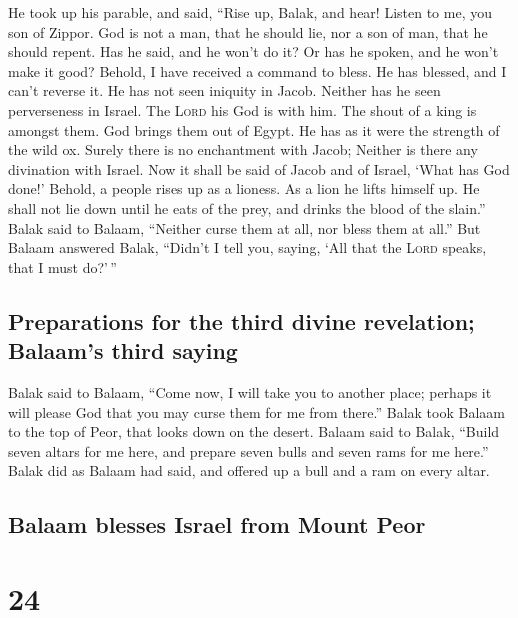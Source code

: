  He took up his parable, and said, ``Rise up, Balak, and
hear! Listen to me, you son of Zippor.  God is not a man,
that he should lie, nor a son of man, that he should repent. Has he
said, and he won't do it? Or has he spoken, and he won't make it good?
 Behold, I have received a command to bless. He has
blessed, and I can't reverse it.  He has not seen
iniquity in Jacob. Neither has he seen perverseness in Israel. The
\textsc{Lord} his God is with him. The shout of a king is amongst them.
 God brings them out of Egypt. He has as it were the
strength of the wild ox.  Surely there is no enchantment
with Jacob; Neither is there any divination with Israel. Now it shall be
said of Jacob and of Israel, `What has God done!' 
Behold, a people rises up as a lioness. As a lion he lifts himself up.
He shall not lie down until he eats of the prey, and drinks the blood of
the slain.''  Balak said to Balaam, ``Neither curse them
at all, nor bless them at all.''  But Balaam answered
Balak, ``Didn't I tell you, saying, `All that the \textsc{Lord} speaks,
that I must do?'\,''

\hypertarget{preparations-for-the-third-divine-revelation-balaams-third-saying}{%
\subsection{Preparations for the third divine revelation; Balaam's third
saying}\label{preparations-for-the-third-divine-revelation-balaams-third-saying}}

 Balak said to Balaam, ``Come now, I will take you to
another place; perhaps it will please God that you may curse them for me
from there.''  Balak took Balaam to the top of Peor, that
looks down on the desert.  Balaam said to Balak, ``Build
seven altars for me here, and prepare seven bulls and seven rams for me
here.''  Balak did as Balaam had said, and offered up a
bull and a ram on every altar.

\hypertarget{balaam-blesses-israel-from-mount-peor}{%
\subsection{Balaam blesses Israel from Mount
Peor}\label{balaam-blesses-israel-from-mount-peor}}

\hypertarget{section-23}{%
\section{24}\label{section-23}}

